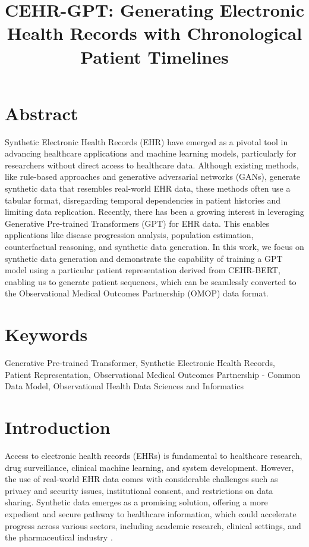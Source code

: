 \title{CEHR-GPT: Generating Electronic Health Records with Chronological Patient Timelines}



\maketitle

\begin{multicols}{2}
\raggedcolumns

\section*{Abstract}
Synthetic Electronic Health Records (EHR) have emerged as a pivotal tool in advancing healthcare applications and machine learning models, particularly for researchers without direct access to healthcare data. Although existing methods, like rule-based approaches and generative adversarial networks (GANs), generate synthetic data that resembles real-world EHR data, these methods often use a tabular format, disregarding temporal dependencies in patient histories and limiting data replication. Recently, there has been a growing interest in leveraging Generative Pre-trained Transformers (GPT) for EHR data. This enables applications like disease progression analysis, population estimation, counterfactual reasoning, and synthetic data generation. In this work, we focus on synthetic data generation and demonstrate the capability of training a GPT model using a particular patient representation derived from CEHR-BERT, enabling us to generate patient sequences, which can be seamlessly converted to the Observational Medical Outcomes Partnership (OMOP) data format. 

\section*{Keywords}
Generative Pre-trained Transformer, Synthetic Electronic Health Records, Patient Representation, Observational Medical Outcomes Partnership - Common Data Model, Observational Health Data Sciences and Informatics

\section{Introduction}
Access to electronic health records (EHRs) is fundamental to healthcare research, drug surveillance, clinical machine learning, and system development. However, the use of real-world EHR data comes with considerable challenges such as privacy and security issues, institutional consent, and restrictions on data sharing. Synthetic data emerges as a promising solution, offering a more expedient and secure pathway to healthcare information, which could accelerate progress across various sectors, including academic research, clinical settings, and the pharmaceutical industry \cite{murray2011design}.


\end{multicols}
